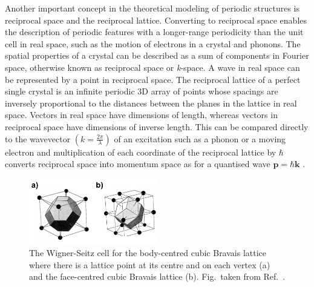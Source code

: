 \documentclass[11pt, twoside]{report}
\begin{document}
Another important concept in the theoretical modeling of periodic structures is reciprocal space and the reciprocal lattice. 
Converting to reciprocal space enables the description of periodic features with a longer-range periodicity than the unit cell in real space, such as the motion of electrons in a crystal and phonons.
The spatial properties of a crystal can be described as a sum of components in Fourier space, otherwise known as reciprocal space or \textit{k}-space. A wave in real space can be represented by a point in reciprocal space. The reciprocal lattice of a perfect single crystal is an infinite periodic 3D array of points whose spacings are inversely proportional to the distances between the planes in the lattice in real space. Vectors in real space have dimensions of length, whereas vectors in reciprocal space have dimensions of inverse length. This can be compared directly to the wavevector $ \left(k  = \frac{2\pi}{\lambda} \right)$ of an excitation such as a phonon or a moving electron and multiplication of each coordinate of the reciprocal lattice by $\hbar$ converts reciprocal space into momentum space as for a quantised wave $\mathbf{p} = \hbar \mathbf{k}$ \cite{Blakemore1}. 

\begin{figure}[h!]
  \centering
    \includegraphics[width=0.5\textwidth]{figures/Wigner-Seitz.png}
    \caption[The Wigner-Seitz cell for the body-centred cubic Bravais lattice where there is a lattice point at its centre and on each vertex (a) and the face-centred cubic Bravais lattice (b).]{The Wigner-Seitz cell for the body-centred cubic Bravais lattice where there is a lattice point at its centre and on each vertex (a) and the face-centred cubic Bravais lattice (b). 
    Fig.~taken from Ref.~.}
  \label{Wigner-Seitz}
\end{figure}
\end{document}
